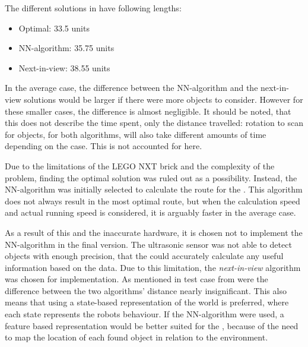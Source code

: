 The different solutions in  have following lengths:
\begin{itemize}
\item Optimal: 33.5 units
\item NN-algorithm: 35.75 units
\item Next-in-view: 38.55 units
\end{itemize}

In the average case, the difference between the NN-algorithm and the next-in-view solutions would be larger if there were more objects to consider. However for these smaller cases, the difference is almost negligible. It should be noted, that this does not describe the time spent, only the distance travelled: rotation to scan for objects, for both algorithms, will also take different amounts of time depending on the case. This is not accounted for here.

Due to the limitations of the LEGO NXT brick and the complexity of the problem, finding the optimal solution was ruled out as a possibility. Instead, the NN-algorithm was initially selected to calculate the route for the \projname{}. This algorithm does not always result in the most optimal route, but when the calculation speed and actual running speed is considered, it is arguably faster in the average case. 

As a result of this and the inaccurate hardware, it is chosen not to implement the NN-algorithm in the final version. The ultrasonic sensor was not able to detect objects with enough precision, that the \projname{} could accurately calculate any useful information based on the data. Due to this limitation, the \emph{next-in-view} algorithm was chosen for implementation. As mentioned in test case from  were the difference between the two algorithms' distance nearly insignificant. This also means that using a state-based representation of the world is preferred, where each state represents the robots behaviour. If the NN-algorithm were used, a feature based representation would be better suited for the \projname{}, because of the need to map the location of each found object in relation to the environment.
